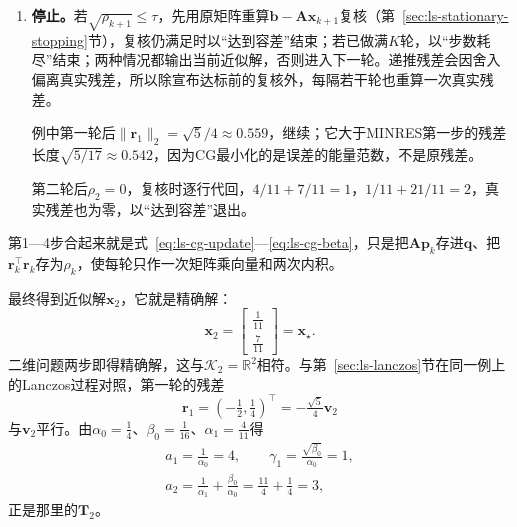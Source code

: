 \begin{enumerate}
 例中第二轮
 \[
  \bm q=\bm A\bm p_1=\begin{bmatrix}-\tfrac{11}8\\\tfrac{11}{16}\end{bmatrix},\qquad
  \bm p_1^\top\bm q=\frac{55}{64},
 \]
 步长为
 \[
  \alpha_1=\frac{5/16}{55/64}=\frac4{11} .
 \]
 于是解与残差更新为
 \[
  \begin{aligned}
  \bm x_2&=\begin{bmatrix}\tfrac14\\\tfrac12\end{bmatrix}+\frac4{11}\begin{bmatrix}-\tfrac7{16}\\\tfrac38\end{bmatrix}=\begin{bmatrix}\tfrac1{11}\\\tfrac7{11}\end{bmatrix},\\
  \bm r_2&=\begin{bmatrix}-\tfrac12\\\tfrac14\end{bmatrix}-\frac4{11}\begin{bmatrix}-\tfrac{11}8\\\tfrac{11}{16}\end{bmatrix}=\bm 0 ,
  \end{aligned}
 \]
 $\rho_2=0$，$\beta_1=0$。

 \item \textbf{停止。}若$\sqrt{\rho_{k+1}}\le\tau$，先用原矩阵重算$\bm b-\bm A\bm x_{k+1}$复核（第~\ref{sec:ls-stationary-stopping}节），复核仍满足时以“达到容差”结束；若已做满$K$轮，以“步数耗尽”结束；两种情况都输出当前近似解，否则进入下一轮。递推残差会因舍入偏离真实残差，所以除宣布达标前的复核外，每隔若干轮也重算一次真实残差。
 
 例中第一轮后$\lVert\bm r_1\rVert_2=\sqrt5/4\approx0.559$，继续；它大于MINRES第一步的残差长度$\sqrt{5/17}\approx0.542$，因为CG最小化的是误差的能量范数，不是原残差。

 第二轮后$\rho_2=0$，复核时逐行代回，$4/11+7/11=1$，$1/11+21/11=2$，真实残差也为零，以“达到容差”退出。
\end{enumerate}
第1—4步合起来就是式~\eqref{eq:ls-cg-update}—\eqref{eq:ls-cg-beta}，只是把$\bm A\bm p_k$存进$\bm q$、把$\bm r_k^\top\bm r_k$存为$\rho_k$，使每轮只作一次矩阵乘向量和两次内积。

最终得到近似解$\bm x_2$，它就是精确解：
\[
 \bm x_2=\begin{bmatrix}\tfrac1{11}\\\tfrac7{11}\end{bmatrix}=\bm x_\star .
\]
二维问题两步即得精确解，这与$\mathcal K_2=\mathbb R^2$相符。与第~\ref{sec:ls-lanczos}节在同一例上的Lanczos过程对照，第一轮的残差
\[
 \bm r_1=(-\tfrac12,\tfrac14)^\top=-\tfrac{\sqrt5}4\bm v_2
\]
与$\bm v_2$平行。由$\alpha_0=\tfrac14$、$\beta_0=\tfrac1{16}$、$\alpha_1=\tfrac4{11}$得
\[
 \begin{gathered}
 a_1=\frac1{\alpha_0}=4,\qquad \gamma_1=\frac{\sqrt{\beta_0}}{\alpha_0}=1,\\
 a_2=\frac1{\alpha_1}+\frac{\beta_0}{\alpha_0}=\frac{11}4+\frac14=3,
 \end{gathered}
\]
正是那里的$\bm T_2$。

